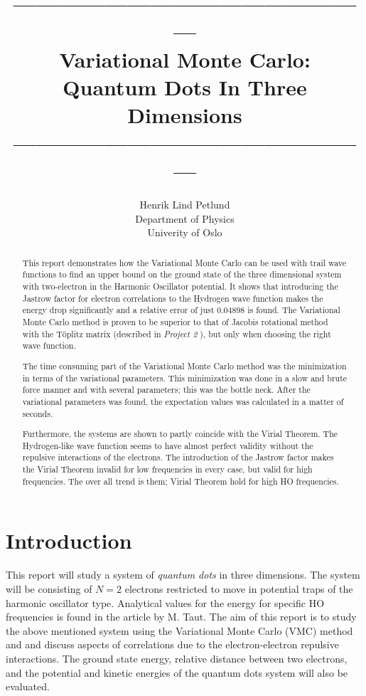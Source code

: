 \documentclass[12pt,english,a4paper]{article}
\title{------------------------------------------------\\Variational Monte Carlo:\\Quantum Dots In Three Dimensions\\------------------------------------------------}
\author{Henrik Lind Petlund\\Department of Physics\\Univerity of Oslo}
\begin{document}
\begin{titlepage}
\maketitle
\begin{abstract}
This report demonstrates how the Variational Monte Carlo can be used with trail wave functions to find an upper bound on the ground state of the three dimensional system with two-electron in the Harmonic Oscillator potential. It shows that introducing the Jastrow factor for electron correlations to the Hydrogen wave function makes the energy drop significantly and a relative error of just $0.04898$ is found. The Variational Monte Carlo method is proven to be superior to that of Jacobis rotational method with the Töplitz matrix (described in \textit{Project 2} \cite{GitHub}), but only when choosing the right wave function.

\vspace{12pt}
The time consuming part of the Variational Monte Carlo method was the minimization in terms of the variational parameters. This minimization was done in a slow and brute force manner and with several parameters; this was the bottle neck. After the variational parameters was found, the expectation values was calculated in a matter of seconds.

\vspace{12pt}
Furthermore, the systems are shown to partly coincide with the Virial Theorem. The Hydrogen-like wave function seems to have almost perfect validity without the repulsive interactions of the electrons. The introduction of the Jastrow factor makes the Virial Theorem invalid for low frequencies in every case, but valid for high frequencies. The over all trend is them; Virial Theorem hold for high HO frequencies.

\newpage

\end{abstract}
\tableofcontents
\end{titlepage}

\section{Introduction} \label{section:introduction}
This report will study a system of \textit{quantum dots} in three dimensions. The system will be consisting of $N=2$ electrons restricted to move in potential traps of the harmonic oscillator type. Analytical values for the energy for specific HO frequencies is found in the article \cite{Taut} by M. Taut. The aim of this report is to study the above mentioned system using the Variational Monte Carlo (VMC) method and and discuss aspects of correlations due to the electron-electron repulsive interactions. The ground state energy, relative distance between two electrons, and the potential and kinetic energies of the quantum dots system will also be evaluated.
\end{document}
